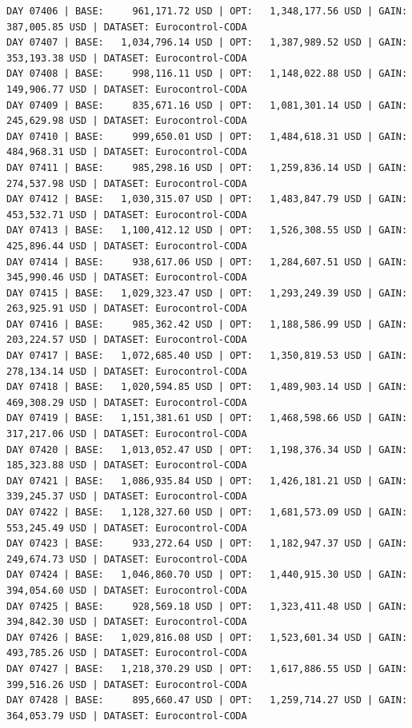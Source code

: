 \documentclass[11pt,a4paper]{article}
\begin{document}
\begin{verbatim}
DAY 07406 | BASE:     961,171.72 USD | OPT:   1,348,177.56 USD | GAIN: 387,005.85 USD | DATASET: Eurocontrol-CODA
DAY 07407 | BASE:   1,034,796.14 USD | OPT:   1,387,989.52 USD | GAIN: 353,193.38 USD | DATASET: Eurocontrol-CODA
DAY 07408 | BASE:     998,116.11 USD | OPT:   1,148,022.88 USD | GAIN: 149,906.77 USD | DATASET: Eurocontrol-CODA
DAY 07409 | BASE:     835,671.16 USD | OPT:   1,081,301.14 USD | GAIN: 245,629.98 USD | DATASET: Eurocontrol-CODA
DAY 07410 | BASE:     999,650.01 USD | OPT:   1,484,618.31 USD | GAIN: 484,968.31 USD | DATASET: Eurocontrol-CODA
DAY 07411 | BASE:     985,298.16 USD | OPT:   1,259,836.14 USD | GAIN: 274,537.98 USD | DATASET: Eurocontrol-CODA
DAY 07412 | BASE:   1,030,315.07 USD | OPT:   1,483,847.79 USD | GAIN: 453,532.71 USD | DATASET: Eurocontrol-CODA
DAY 07413 | BASE:   1,100,412.12 USD | OPT:   1,526,308.55 USD | GAIN: 425,896.44 USD | DATASET: Eurocontrol-CODA
DAY 07414 | BASE:     938,617.06 USD | OPT:   1,284,607.51 USD | GAIN: 345,990.46 USD | DATASET: Eurocontrol-CODA
DAY 07415 | BASE:   1,029,323.47 USD | OPT:   1,293,249.39 USD | GAIN: 263,925.91 USD | DATASET: Eurocontrol-CODA
DAY 07416 | BASE:     985,362.42 USD | OPT:   1,188,586.99 USD | GAIN: 203,224.57 USD | DATASET: Eurocontrol-CODA
DAY 07417 | BASE:   1,072,685.40 USD | OPT:   1,350,819.53 USD | GAIN: 278,134.14 USD | DATASET: Eurocontrol-CODA
DAY 07418 | BASE:   1,020,594.85 USD | OPT:   1,489,903.14 USD | GAIN: 469,308.29 USD | DATASET: Eurocontrol-CODA
DAY 07419 | BASE:   1,151,381.61 USD | OPT:   1,468,598.66 USD | GAIN: 317,217.06 USD | DATASET: Eurocontrol-CODA
DAY 07420 | BASE:   1,013,052.47 USD | OPT:   1,198,376.34 USD | GAIN: 185,323.88 USD | DATASET: Eurocontrol-CODA
DAY 07421 | BASE:   1,086,935.84 USD | OPT:   1,426,181.21 USD | GAIN: 339,245.37 USD | DATASET: Eurocontrol-CODA
DAY 07422 | BASE:   1,128,327.60 USD | OPT:   1,681,573.09 USD | GAIN: 553,245.49 USD | DATASET: Eurocontrol-CODA
DAY 07423 | BASE:     933,272.64 USD | OPT:   1,182,947.37 USD | GAIN: 249,674.73 USD | DATASET: Eurocontrol-CODA
DAY 07424 | BASE:   1,046,860.70 USD | OPT:   1,440,915.30 USD | GAIN: 394,054.60 USD | DATASET: Eurocontrol-CODA
DAY 07425 | BASE:     928,569.18 USD | OPT:   1,323,411.48 USD | GAIN: 394,842.30 USD | DATASET: Eurocontrol-CODA
DAY 07426 | BASE:   1,029,816.08 USD | OPT:   1,523,601.34 USD | GAIN: 493,785.26 USD | DATASET: Eurocontrol-CODA
DAY 07427 | BASE:   1,218,370.29 USD | OPT:   1,617,886.55 USD | GAIN: 399,516.26 USD | DATASET: Eurocontrol-CODA
DAY 07428 | BASE:     895,660.47 USD | OPT:   1,259,714.27 USD | GAIN: 364,053.79 USD | DATASET: Eurocontrol-CODA

\end{verbatim}
\end{document}

